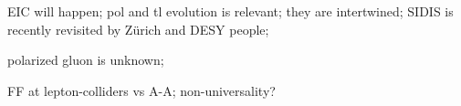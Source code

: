 EIC will happen;
pol and tl evolution is relevant;
they are intertwined;
SIDIS is recently revisited by Zürich and DESY people;

polarized gluon is unknown;

FF at lepton-colliders vs A-A; non-universality?

